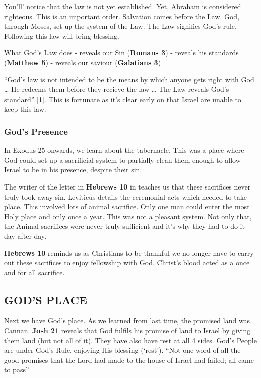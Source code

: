 \documentclass[]{article}
\begin{document}
You'll' notice that the law is not yet established. Yet, Abraham is
considered righteous. This is an important order. Salvation comes before
the Law. God, through Moses, set up the system of the Law. The Law
signifies God's rule. Following this law will bring blessing.

What God's Law does - reveals our Sin (\textbf{Romans 3}) - reveals his
standards (\textbf{Matthew 5}) - reveals our saviour (\textbf{Galatians
3})

``God's law is not intended to be the means by which anyone gets right
with God \ldots{} He redeems them before they recieve the law \ldots{}
The Law reveals God's standard'' {[}1{]}. This is fortunate as it's
clear early on that Israel are unable to keep this law.

\hypertarget{gods-presence}{%
\subsubsection{God's Presence}\label{gods-presence}}

In Exodus 25 onwards, we learn about the tabernacle. This was a place
where God could set up a sacrificial system to partially clean them
enough to allow Israel to be in his presence, despite their sin.

The writer of the letter in \textbf{Hebrews 10} in teaches us that these
sacrifices never truly took away sin. Leviticus details the ceremonial
acts which needed to take place. This involved lots of animal sacrifice.
Only one man could enter the most Holy place and only once a year. This
was not a pleasant system. Not only that, the Animal sacrifices were
never truly sufficient and it's why they had to do it day after day.

\textbf{Hebrews 10} reminds us as Christians to be thankful we no longer
have to carry out these sacrifices to enjoy fellowship with God.
Christ's blood acted as a once and for all sacrifice.

\hypertarget{gods-place}{%
\subsection{GOD'S PLACE}\label{gods-place}}

Next we have God's place. As we learned from last time, the promised
land was Cannan. \textbf{Josh 21} reveals that God fulfils his promise
of land to Israel by giving them land (but not all of it). They have
also have rest at all 4 sides. God's People are under God's Rule,
enjoying His blessing (`rest'). ``Not one word of all the good promises
that the Lord had made to the house of Israel had failed; all came to
pass''
\end{document}
